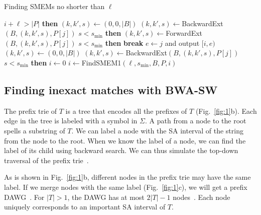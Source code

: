\documentclass[webpdf,contemporary,large,namedate]{oup-authoring-template}%
\begin{document}
\begin{algorithm}[b]
	\caption{Finding SMEMs no shorter than $\ell$~\citep{DBLP:conf/dlt/Gagie24}}\label{algo:smem}
	\begin{algorithmic}[1]
			 $i+\ell>|P|$ {\bf then} 
			\State $(k,k',s)\gets(0,0,|B|)$
				\State $(k,k',s)\gets${\sc BackwardExt}$(B,(k,k',s),P[j])$
				 $s<s_{\min}$ {\bf then} 
			\EndFor
				\State $(k,k',s)\gets${\sc ForwardExt}$(B,(k,k',s),P[j])$
				 $s<s_{\min}$ {\bf then} {\bf break}
			\EndFor
			\State $e\gets j$ and output $[i,e)$
			\State $(k,k',s)\gets(0,0,|B|)$
				\State $(k,k',s)\gets${\sc BackwardExt}$(B,(k,k',s),P[j])$
				 $s<s_{\min}$ {\bf then} 
			\EndFor
		\EndProcedure
			\State $i\gets0$
			\Repeat
			\State $i\gets${\sc FindSMEM1}$(\ell,s_{\min},B,P,i)$
		\EndProcedure
	\end{algorithmic}
\end{algorithm}

\subsection{Finding inexact matches with BWA-SW}

The prefix trie of $T$ is a tree that encodes all the prefixes of $T$ (Fig.~\ref{fig:1}b).
Each edge in the tree is labeled with a symbol in $\Sigma$.
A path from a node to the root spells a substring of $T$.
We can label a node with the SA interval of the string from the node to the root.
When we know the label of a node, we can find the label of its child using backward search.
We can thus simulate the top-down traversal of the prefix trie~\citep{Lam:2008aa}.

As is shown in Fig.~\ref{fig:1}b, different nodes in the prefix trie may have the same label.
If we merge nodes with the same label (Fig.~\ref{fig:1}c), we will get a prefix DAWG~\citep{DBLP:journals/eatcs/BlumerBEHM83}.
For $|T|>1$, the DAWG has at most $2|T|-1$ nodes~\citep{DBLP:conf/icalp/BlumerBEHM84}.
Each node uniquely corresponds to an important SA interval of $T$.
\end{document}
